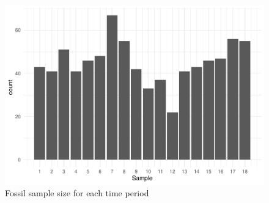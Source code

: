 \documentclass[
  12pt,
]{article}
\begin{document}
\begin{figure}

{\centering \includegraphics{paper_files/figure-latex/unnamed-chunk-2-1} 

}

\caption{Fossil sample size for each time period}\label{fig:unnamed-chunk-2}
\end{figure}
\end{document}
